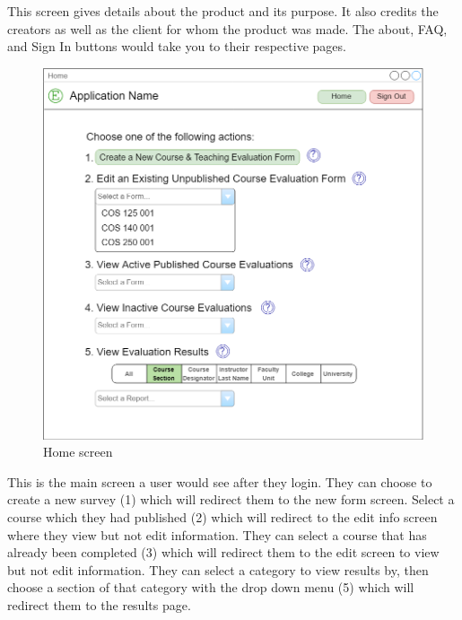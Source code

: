 \documentclass{article}
\begin{document}
This screen gives details about the product and its purpose. It also credits the creators as well as the client for whom the product was made.  The about, FAQ, and Sign In buttons would take you to their respective pages.

\begin{center}
\begin{figure}[H]
    \centering
    \caption{Home screen}
    \includegraphics[scale=.25]{images/home_screen.png}
\end{figure}
\end{center}

This is the main screen a user would see after they login. They can choose to create a new survey (1) which will redirect them to the new form screen. Select a course which they had published (2) which will redirect to the edit info screen where they view but not edit information.  They can select a course that has already been completed (3) which will redirect them to the edit screen to view but not edit information.  They can select a category to view results by, then choose a section of that category with the drop down menu (5) which will redirect them to the results page.
\end{document}
